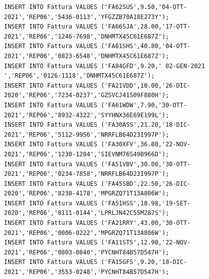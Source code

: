 \documentclass[12pt]{report}
\begin{document}
\begin{scriptsize}
\begin{verbatim}
INSERT INTO Fattura VALUES ('FA62SUS',9.50,'04-OTT-2021','REP06','5436-0113','YFGZZB70A18E273Y');
INSERT INTO Fattura VALUES ('FA66SJA',28.00,'17-OTT-2021','REP06','1246-7698','DNHMTX45C61E687Z');
INSERT INTO Fattura VALUES ('FA61SHS',40.80,'04-OTT-2021','REP06','0823-6548','DNHMTX45C61E687Z');
INSERT INTO Fattura VALUES ('FA84GFD',9.20,' 02-GEN-2021 ','REP06','0126-1118','DNHMTX45C61E687Z');
INSERT INTO Fattura VALUES ('FA21VDD',10.00,'26-DIC-2020','REP06','7234-0237','GZSVCJ41S09F880H');
INSERT INTO Fattura VALUES ('FA61WDW',7.90,'30-OTT-2021','REP06','8932-4322','SYYHNX36E69E199L');
INSERT INTO Fattura VALUES ('FA30ASS',21.20,'18-DIC-2021','REP06','5112-9956','NRRFLB64D23I997P');
INSERT INTO Fattura VALUES ('FA30XFV',36.80,'22-NOV-2021','REP06','1230-1204','SIEVNM76S49B966D');
INSERT INTO Fattura VALUES ('FA51VBV',30.00,'30-OTT-2021','REP06','0234-7858','NRRFLB64D23I997P');
INSERT INTO Fattura VALUES ('FA45SBD',22.50,'26-DIC-2020','REP06','8238-4178','MPGRZQ71T13A806W');
INSERT INTO Fattura VALUES ('FA51HSS',18.98,'19-SET-2020','REP06','8111-0144','LPRLJN42C55M287S');
INSERT INTO Fattura VALUES ('FA21RRY',43.00,'30-OTT-2021','REP06','0006-0222','MPGRZQ71T13A806W');
INSERT INTO Fattura VALUES ('FA11STS',12.90,'22-NOV-2021','REP06','0803-0840','PYCNHT84B57D547H');
INSERT INTO Fattura VALUES ('FA15GFS',9.20,'18-DIC-2021','REP06','3553-0248','PYCNHT84B57D547H');


\end{verbatim}
\end{scriptsize}
\end{document}
